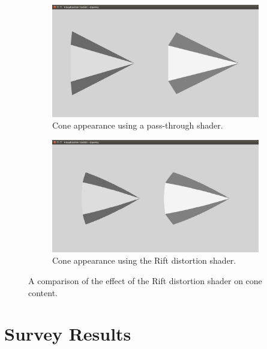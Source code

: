 \documentclass[MSc,paper=a4,pagesize=auto]{icldt}
\begin{document}
\begin{figure}[htbp!]
\centering
\begin{subfigure}{\textwidth}
    \centering
    \includegraphics[width=\linewidth]{resources/undistorted_cone}
    \caption{Cone appearance using a pass-through shader.}
	\label{fig:undistorted_cone}
\end{subfigure}

\centering
\begin{subfigure}{\textwidth}
    \centering
    \includegraphics[width=\linewidth]{resources/distorted_cone}
    \caption{Cone appearance using the Rift distortion shader.}
	\label{fig:distorted_cone}
\end{subfigure}    
    \caption{A comparison of the effect of the Rift distortion shader on cone content.}
    \label{fig:cone_distortion_comparison}
\end{figure}

\chapter{Survey Results}

\end{document}
